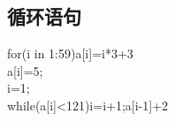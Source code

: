\documentclass[a4paper,12pt]{ctexbook}
\begin{document}
\begin{flushleft}
\subsection{循环语句}
for(i in 1:59){a[i]=i*3+3}\\

a[i]=5;\\
i=1;\\
while(a[i]<121){i=i+1;a[i-1]+2}





\end{flushleft}
\end{document}
